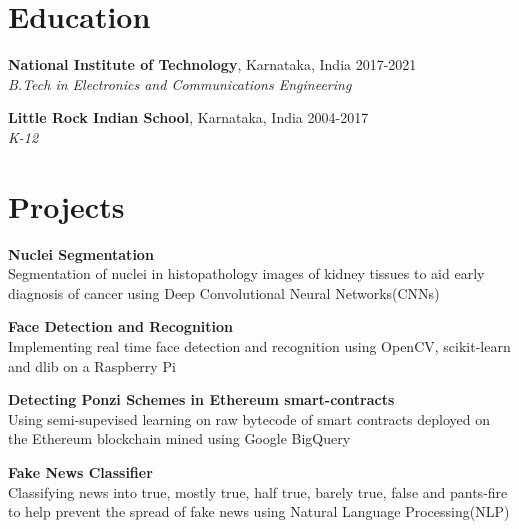 \documentclass[margin]{res}
\begin{document}
  \address{National Institute of Technology\\Karnataka, India\\linkedin.com/in/rshwndsz}
  \address{(91+) 9611212081\\russel.171ec143@nitk.edu.in\\github.com/rshwndsz}

  \begin{resume}
    \section{Education}
      \textbf{National Institute of Technology}, Karnataka, India\hfill 
      2017-2021
      \\
      {\sl B.Tech in Electronics and Communications Engineering}\hfill 
      

      \textbf{Little Rock Indian School}, Karnataka, India\hfill
      2004-2017
      \\
      {\sl K-12}\hfill

    \section{Projects}
      \par
      \textbf{Nuclei Segmentation}\\
      Segmentation of nuclei in histopathology images of kidney tissues to aid early diagnosis of cancer using Deep Convolutional Neural Networks(CNNs)

      \par
      \textbf{Face Detection and Recognition}\\
      Implementing real time face detection and recognition using OpenCV, scikit-learn and dlib on a Raspberry Pi
      
      \par
      \textbf{Detecting Ponzi Schemes in Ethereum smart-contracts}\\
      Using semi-supevised learning on raw bytecode of smart contracts deployed on the Ethereum blockchain mined using Google BigQuery

      \par
      \textbf{Fake News Classifier}\\
      Classifying news into true, mostly true, half true, barely true, false and pants-fire to help prevent the spread of fake news using Natural Language Processing(NLP)


\end{resume}
\end{document}
